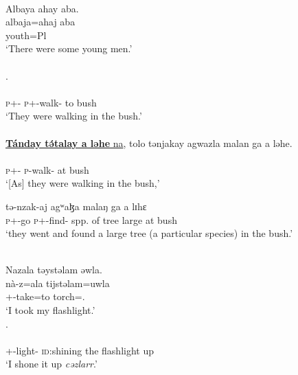 \ea \label{ex:11:23}
\\
Albaya  ahay  aba.\\   
\gll  albaja=ahaj  aba   \\
      youth=Pl  {\EXT} \\
\glt ‘There were some young men.’\\ 

\medskip
{}\\. \\
\\
      \textsc{p}+{\IFV}-{\PRG} \textsc{p}+{\IFV}-walk-{\CL}  to  bush\\
\glt  ‘They were walking in the bush.’\\

\medskip
{}\\
\underline{\textbf{Tánday  t\'ətalay  a  ləhe} na},  tolo  tənjakay  agwazla  malan  ga  a  ləhe.\\
\gll  {}    \\ 
      \textsc{p}+{\IFV}-{\PRG} \textsc{p}-walk-{\CL}  at bush {\PSP}\\ 
\glt ‘[As] they were walking in the bush,’ \\     
      
      \medskip
      
 {tə-nzak-aj} {agʷaɮa} {malaŋ} {ga} {a} {lɪhɛ}\\
     \textsc{p}+{\PFV}-go  \textsc{p}+{\PFV}-find{}-{\CL}  {spp. of tree}  large {\ADJ}      at  bush\\
\glt  ‘they went and found a large tree (a particular species) in the bush.’
\z

\ea \label{ex:11:24}\\
Nazala  təystəlam  əwla.\\    
\gll  nà-z=ala  tijstəlam=uwla  \\  
      {\oneS}+{\PFV}-take=to  torch={\oneS}.{\POSS} \\  
\glt ‘I took my flashlight.’\\

      .\\      
\\
     {\oneS}+{\PFV}-light{}-{\CL}  {\textsc{id}:shining the flashlight up}\\
\glt  ‘I shone it up \textit{cəzlarr}.’\\


